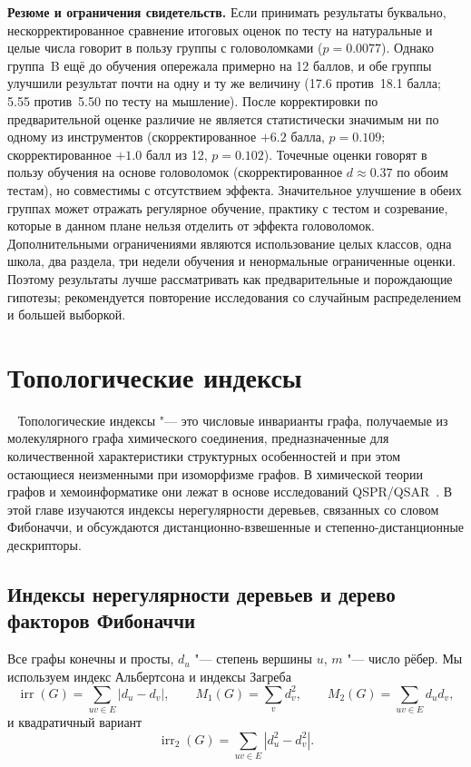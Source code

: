 \documentclass[a4paper,14pt]{extreport}
\theoremstyle{plain}
\theoremstyle{definition}
\theoremstyle{remark}
\begin{document}
\textbf{Резюме и ограничения свидетельств.}
Если принимать результаты буквально, нескорректированное сравнение итоговых оценок по тесту на натуральные и целые числа говорит в пользу группы с головоломками ($p=0.0077$). Однако группа~B ещё до обучения опережала примерно на 12 баллов, и обе группы улучшили результат почти на одну и ту же величину (17.6 против\ 18.1 балла; 5.55 против\ 5.50 по тесту на мышление). После корректировки по предварительной оценке различие не является статистически значимым ни по одному из инструментов (скорректированное $+6.2$ балла, $p=0.109$; скорректированное $+1.0$ балл из 12, $p=0.102$). Точечные оценки говорят в пользу обучения на основе головоломок (скорректированное $d\approx0.37$ по обоим тестам), но совместимы с отсутствием эффекта. Значительное улучшение в обеих группах может отражать регулярное обучение, практику с тестом и созревание, которые в данном плане нельзя отделить от эффекта головоломок. Дополнительными ограничениями являются использование целых классов, одна школа, два раздела, три недели обучения и ненормальные ограниченные оценки. Поэтому результаты лучше рассматривать как предварительные и порождающие гипотезы; рекомендуется повторение исследования со случайным распределением и большей выборкой.
\chapter{Топологические индексы}~\label{sec5}
Топологические индексы "--- это числовые инварианты графа, получаемые из молекулярного графа химического соединения, предназначенные для количественной характеристики структурных особенностей и при этом
остающиеся неизменными при изоморфизме графов. В химической теории графов и хемоинформатике они лежат в основе исследований QSPR/QSAR~\cite{Todeschini2000}.
В этой главе изучаются индексы нерегулярности деревьев, связанных со словом Фибоначчи, и обсуждаются дистанционно-взвешенные и степенно-дистанционные дескрипторы.
\section{Индексы нерегулярности деревьев и дерево факторов Фибоначчи}\label{sec5.1}

Все графы конечны и просты, $d_u$ "--- степень вершины $u$, $m$ "--- число рёбер. Мы используем индекс Альбертсона и индексы Загреба
\begin{equation}
	\operatorname{irr}(G)=\sum_{uv\in E}|d_u-d_v|,\qquad M_1(G)=\sum_{v}d_v^{2},\qquad M_2(G)=\sum_{uv\in E}d_ud_v ,
\end{equation}
и квадратичный вариант
\begin{equation}
	\operatorname{irr}_2(G)=\sum_{uv\in E}|d_u^{2}-d_v^{2}| .
\end{equation}
\end{document}
